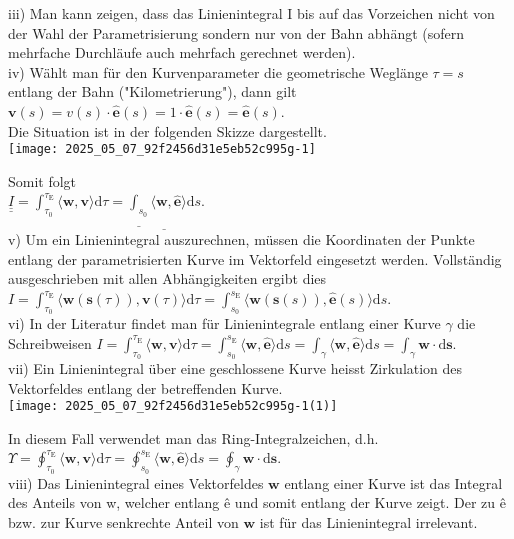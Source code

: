 \documentclass[10pt]{article}
\begin{document}
iii) Man kann zeigen, dass das Linienintegral I bis auf das Vorzeichen nicht von der Wahl der Parametrisierung sondern nur von der Bahn abhängt (sofern mehrfache Durchläufe auch mehrfach gerechnet werden).\\
iv) Wählt man für den Kurvenparameter die geometrische Weglänge $\tau=s$ entlang der Bahn ("Kilometrierung"), dann gilt\\
$\mathbf{v}(s)=v(s) \cdot \hat{\mathbf{e}}(s)=1 \cdot \hat{\mathbf{e}}(s)=\hat{\mathbf{e}}(s)$.\\
Die Situation ist in der folgenden Skizze dargestellt.\\
\texttt{[image: 2025\_05\_07\_92f2456d31e5eb52c995g-1]}

Somit folgt\\
$\underline{\underline{I}}=\int_{\tau_{0}}^{\tau_{\mathrm{E}}}\langle\mathbf{w}, \mathbf{v}\rangle \mathrm{d} \tau=\underline{\underline{\int_{s_{0}}}\langle\mathbf{w}, \hat{\mathbf{e}}\rangle \mathrm{d} s}$.\\
v) Um ein Linienintegral auszurechnen, müssen die Koordinaten der Punkte entlang der parametrisierten Kurve im Vektorfeld eingesetzt werden. Vollständig ausgeschrieben mit allen Abhängigkeiten ergibt dies\\
$I=\int_{\tau_{0}}^{\tau_{\mathrm{E}}}\langle\mathbf{w}(\mathbf{s}(\tau)), \mathbf{v}(\tau)\rangle \mathrm{d} \tau=\int_{s_{0}}^{s_{\mathrm{E}}}\langle\mathbf{w}(\mathbf{s}(s)), \hat{\mathbf{e}}(s)\rangle \mathrm{d} s$.\\
vi) In der Literatur findet man für Linienintegrale entlang einer Kurve $\gamma$ die Schreibweisen $I=\int_{\tau_{0}}^{\tau_{\mathrm{E}}}\langle\mathbf{w}, \mathbf{v}\rangle \mathrm{d} \tau=\int_{s_{0}}^{s_{\mathrm{E}}}\langle\mathbf{w}, \hat{\mathbf{e}}\rangle \mathrm{d} s=\int_{\gamma}\langle\mathbf{w}, \hat{\mathbf{e}}\rangle \mathrm{d} s=\int_{\gamma} \mathbf{w} \cdot \mathrm{d} \mathbf{s}$.\\
vii) Ein Linienintegral über eine geschlossene Kurve heisst Zirkulation des Vektorfeldes entlang der betreffenden Kurve.\\
\texttt{[image: 2025\_05\_07\_92f2456d31e5eb52c995g-1(1)]}

In diesem Fall verwendet man das Ring-Integralzeichen, d.h.\\
$\Upsilon=\oint_{\tau_{0}}^{\tau_{\mathrm{E}}}\langle\mathbf{w}, \mathbf{v}\rangle \mathrm{d} \tau=\oint_{s_{0}}^{s_{\mathrm{E}}}\langle\mathbf{w}, \hat{\mathbf{e}}\rangle \mathrm{d} s=\oint_{\gamma} \mathbf{w} \cdot \mathrm{d} \mathbf{s}$.\\
viii) Das Linienintegral eines Vektorfeldes $\mathbf{w}$ entlang einer Kurve ist das Integral des Anteils von w, welcher entlang ê und somit entlang der Kurve zeigt. Der zu ê bzw. zur Kurve senkrechte Anteil von $\mathbf{w}$ ist für das Linienintegral irrelevant.
\end{document}
